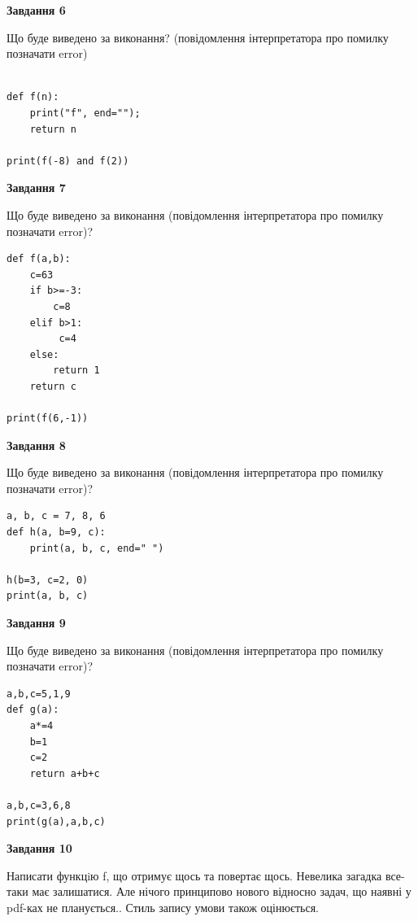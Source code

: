 \documentclass[12pt, ukrainian]{article}
\begin{document}
{\begin {large}
{\begin {center}\textbf{Завдання 6}\end {center}}

Що буде виведено за виконання? (повідомлення інтерпретатора про помилку позначати error)\par
\begin{verbatim}

def f(n):
    print("f", end="");
    return n

print(f(-8) and f(2))
\end{verbatim}

{\begin {center}\textbf{Завдання 7}\end {center}}

Що буде виведено за виконання (повідомлення інтерпретатора про помилку позначати error)?\par
\begin{verbatim}
def f(a,b):
    c=63
    if b>=-3:
        c=8
    elif b>1:
         c=4
    else: 
        return 1
    return c

print(f(6,-1))
\end{verbatim}

{\begin {center}\textbf{Завдання 8}\end {center}}

Що буде виведено за виконання (повідомлення інтерпретатора про помилку позначати error)?\par
\begin{verbatim}
a, b, c = 7, 8, 6
def h(a, b=9, c):
    print(a, b, c, end=" ")

h(b=3, c=2, 0)
print(a, b, c)
\end{verbatim}

{\begin {center}\textbf{Завдання 9}\end {center}}

Що буде виведено за виконання (повідомлення інтерпретатора про помилку позначати error)?\par
\begin{verbatim}
a,b,c=5,1,9
def g(a):
    a*=4
    b=1
    c=2
    return a+b+c

a,b,c=3,6,8
print(g(a),a,b,c)
\end{verbatim}

{\begin {center}\textbf{Завдання 10}\end {center}}


Написати функцiю f, що отримує щось та повертає щось. Невелика загадка все-таки має залишатися. Але нічого принципово нового відносно задач, що наявні у pdf-ках не планується.. Стиль запису умови також оцінюється.\par
\end {large}}
\newpage
\end{document}
